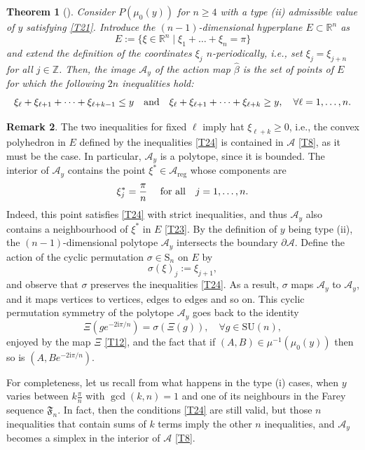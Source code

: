 \documentclass[a4paper,11pt,reqno]{amsart}
\newtheorem{thm}{Theorem}[section]
\theoremstyle{definition}
\newtheorem{rem}[thm]{Remark}
\numberwithin{equation}{section}
\newcommand{\be}{\begin{equation}}
\newcommand{\ee}{\end{equation}}
\def\cA{{\mathcal A}}                       %
\def\reg{\mathrm{reg}}                      %
\def\ri{{\mathrm{i}}}                       %
\def\bR{{\mathbb R}}                        %
\def\bZ{{\mathbb Z}}                        %
\def\SU{\mathrm{SU}}                        %
\def\reg{\mathrm{reg}}                      %
\def\fF{{\mathfrak F}}                      %
\begin{document}
\begin{thm}[\cite{FK}]\label{thmT1}
Consider $P(\mu_0(y))$ for $n\geq 4$ with a type (ii) admissible value of $y$ satisfying \eqref{T21}.
Introduce the $(n-1)$-dimensional hyperplane $E \subset \bR^n$ as
\be
E:= \{ \xi \in \bR^n \mid \xi_1 + \dots + \xi_n = \pi \}
\label{T23}\ee
and  extend the definition of the coordinates $\xi_j$ $n$-periodically, i.e., set $\xi_j = \xi_{j+n}$ for all $j\in \bZ$.
Then, the image $\cA_y$ of the action map $\hat \beta$ is the set of points of $E$ for which the
following $2n$ inequalities hold:
\be
\xi_\ell + \xi_{\ell +1} + \cdots + \xi_{\ell + k - 1} \leq y
\quad \hbox{and} \quad
\xi_\ell + \xi_{\ell +1} + \cdots + \xi_{\ell + k } \geq y, \quad \forall \ell=1,\dots,n.
\label{T24}\ee
\end{thm}

\begin{rem}\label{remT2}
The two inequalities for fixed $\ell$ imply hat $\xi_{\ell + k} \geq 0$, i.e., the convex polyhedron in $E$ defined by the inequalities
\eqref{T24}
is contained in $\cA$ \eqref{T8}, as it must be the case.
 In particular, $\cA_y$ is a polytope, since it is bounded.
The interior of $\cA_y$ contains the point $\xi^* \in \cA_\reg$ whose components are
\be
\xi^*_j = \frac{\pi}{n} \quad\hbox{ for all}\quad  j=1,\dots,n.
\label{xistar}\ee
Indeed, this point satisfies \eqref{T24} with strict inequalities, and thus $\cA_y$ also contains a neighbourhood of $\xi^*$ in $E$ \eqref{T23}.
By the definition of $y$ being type (ii), the $(n-1)$-dimensional polytope $\cA_y$ intersects the boundary $\partial \cA$.
 Define the action of the cyclic permutation $\sigma \in {\mathrm{S}}_n$ on $E$ by
\be
\sigma(\xi)_j := \xi_{j+1},
\label{T25}\ee
and observe that $\sigma$ preserves the inequalities \eqref{T24}. As a result, $\sigma$ maps $\cA_y$ to $\cA_y$,
and it maps vertices to vertices, edges to edges and so on. This cyclic permutation symmetry of the polytope $\cA_y$  goes
back to the identity
\be
\Xi (g e^{-2\ri \pi/n} ) = \sigma(\Xi(g)), \quad \forall g\in \SU(n),
\label{T26+}\ee
enjoyed by the map $\Xi$ \eqref{T12}, and the  fact that if $(A,B) \in \mu^{-1}(\mu_0(y))$ then so is $(A, B e^{-2\ri \pi/n})$.
\end{rem}

For completeness, let us recall from \cite{FK} what happens
in the type (i) cases, when $y$ varies between $k \frac{\pi}{n}$ with $\gcd(k, n)=1$
and one of its neighbours in  the Farey sequence $\fF_n$.
In fact, then the  conditions \eqref{T24} are still valid, but those $n$ inequalities
that contain sums of $k$ terms imply
the other $n$ inequalities, and  $\cA_y$ becomes a simplex in the interior of $\cA$ \eqref{T8}.
\end{document}
